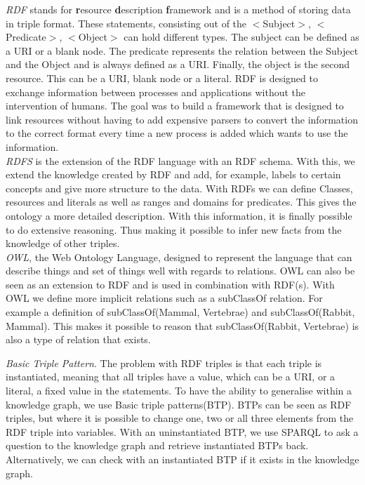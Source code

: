 \documentclass[11pt,letterpaper ,oneside ]{book}
\begin{document}
	\textit{RDF} \cite{rdfPrimer:2014} stands for \textbf{r}esource \textbf{d}escription \textbf{f}ramework and is a method of storing data in triple format. These statements, consisting out of the $<$Subject$>$, $<$Predicate$>$, $<$Object$>$ can hold different types. The subject can be defined as a URI or a blank node. The predicate represents the relation between the Subject and the Object and is always defined as a URI. Finally, the object is the second resource. This can be a URI, blank node or a literal.
	RDF is designed to exchange information between processes and applications without the intervention of humans. The goal was to build a framework that is designed to link resources without having to add expensive parsers to convert the information to the correct format every time a new process is added which wants to use the information.\\
	
	\textit{RDFS} \cite{RDFSchema:2014} is the extension of the RDF language with an RDF schema. With this, we extend the knowledge created by RDF and add, for example, labels to certain concepts and give more structure to the data. With RDFs we can define Classes, resources and literals as well as ranges and domains for predicates. This gives the ontology a more detailed description. With this information, it is finally possible to do extensive reasoning. Thus making it possible to infer new facts from the knowledge of other triples.\\
	
	\textit{OWL}\cite{OWLPrimer:2012}, the Web Ontology Language, designed to represent the language that can describe things and set of things well with regards to relations. OWL can also be seen as an extension to RDF and is used in combination with RDF(s). With OWL we define more implicit relations such as a subClassOf relation. For example a definition of subClassOf(Mammal, Vertebrae) and subClassOf(Rabbit, Mammal). This makes it possible to reason that subClassOf(Rabbit, Vertebrae) is also a type of relation that exists. 
	
	\textit{Basic Triple Pattern}. The problem with RDF triples is that each triple is instantiated, meaning that all triples have a value, which can be a URI, or a literal,  a fixed value in the statements. 
	To have the ability to generalise within a knowledge graph, we use Basic triple patterns(BTP). BTPs can be seen as RDF triples, but where it is possible to change one, two or all three elements from the RDF triple into variables. With an uninstantiated BTP, we use SPARQL to ask a question to the knowledge graph and retrieve instantiated BTPs back. Alternatively, we can check with an instantiated BTP if it exists in the knowledge graph.\\
	
\end{document}
